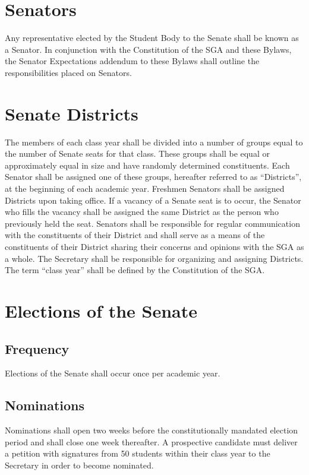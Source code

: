 \documentclass[12pt]{scrreprt}
\begin{document}
\section{Senators}
Any representative elected by the Student Body to the Senate shall be known as 
a Senator. In conjunction with the Constitution of the SGA and these Bylaws, the Senator Expectations addendum to these Bylaws shall outline the responsibilities placed on Senators.

\section{Senate Districts}
The members of each class year shall be divided into a number of groups equal to the number of Senate seats for that class. These groups shall be equal or approximately equal in size and have randomly determined constituents. Each Senator shall be assigned one of these groups, hereafter referred to as “Districts”, at the beginning of each academic year. Freshmen Senators shall be assigned Districts upon taking office. If a vacancy of a Senate seat is to occur, the Senator who fills the vacancy shall be assigned the same District as the person who previously held the seat. Senators shall be responsible for regular communication with the constituents of their District and shall serve as a means of the constituents of their District sharing their concerns and opinions with the SGA as a whole. The Secretary shall be responsible for organizing and assigning Districts. The term “class year” shall be defined by the Constitution of the SGA.

\section{Elections of the Senate}

\subsection{Frequency}
Elections of the Senate shall occur once per academic year. 

\subsection{Nominations}
Nominations shall open two weeks before the constitutionally mandated election 
period and shall close one week thereafter. A prospective candidate must 
deliver a petition with signatures from 50 students within their class year to 
the Secretary in order to become nominated.
\end{document}
